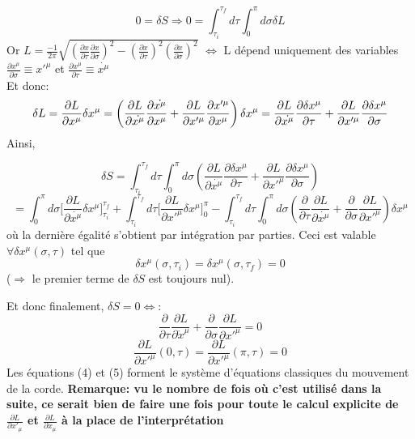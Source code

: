 \documentclass[a4paper,12pt]{article}
\begin{document}
\begin{equation}
0=\delta S
\Rightarrow
0=\int_{\tau_{i}}^{\tau_{f}}d\tau\int_{0}^{\pi}d\sigma\delta L
\end{equation}
Or $L=\frac{-1}{2\pi}\sqrt{\left( \frac{\partial x}{\partial \tau}\frac{\partial x}{\partial \sigma}\right)^{2}-\left( \frac{\partial x}{\partial \tau}\right) ^{2}\left( \frac{\partial x}{\partial \sigma}\right) ^{2}}$ $\Leftrightarrow$ L dépend uniquement des variables $ \frac{\partial x^{\mu}}{\partial \sigma}\equiv x'^{\mu}$ et $\frac{\partial x^{\mu}}{\partial \tau}\equiv \dot{x^{\mu}}$\\
Et donc:
\begin{equation}
\delta L= \frac{\partial L}{\partial x^{\mu}}\delta x^{\mu}=\left( \frac{\partial L}{\partial \dot{x^{\mu}}}\frac{\partial \dot{x^{\mu}}}{\partial x^{\mu}}+\frac{\partial L}{\partial x'^{\mu}}\frac{\partial x'^{\mu}}{\partial x^{\mu}}\right) \delta x^{\mu}\\
=\frac{\partial L}{\partial \dot{x^{\mu}}}\frac{\partial\delta x^{\mu}}{\partial \tau}+\frac{\partial L}{\partial x'^{\mu}}\frac{\partial\delta x^{\mu}}{\partial \sigma}
\end{equation}
Ainsi,

$$\delta S=\int_{\tau_{i}}^{\tau_{f}}d\tau\int_{0}^{\pi}d\sigma\left( \frac{\partial L}{\partial \dot{x^{\mu}}}\frac{\partial\delta x^{\mu}}{\partial \tau}+\frac{\partial L}{\partial x'^{\mu}}\frac{\partial\delta x^{\mu}}{\partial \sigma}\right) $$
$$=\int_{0}^{\pi}d\sigma \Big[\frac{\partial L}{\partial \dot{x^{\mu}}}\delta x^{\mu}\Big]^{\tau_{f}}_{\tau_{i}}+\int_{\tau_{i}}^{\tau_{f}}d\tau \Big[\frac{\partial L}{\partial x'^{\mu}}\delta x^{\mu}\Big]^{\pi}_{0}-\int_{\tau_{i}}^{\tau_{f}}d\tau\int_{0}^{\pi}d\sigma\left( \frac{\partial}{\partial \tau}\frac{\partial L}{\partial \dot{x^{\mu}}}+\frac{\partial}{\partial \sigma}\frac{\partial L}{\partial x'^{\mu}}\right)\delta x^{\mu}$$
où la dernière égalité s'obtient par intégration par parties.
Ceci est valable $\forall \delta x^{\mu}(\sigma,\tau)$ tel que 
$$\delta x^{\mu}(\sigma,\tau_{i})=\delta x^{\mu}(\sigma,\tau_{f})=0$$
($\Rightarrow$ le premier terme de $\delta S$ est toujours nul).

Et donc finalement, $\delta S=0 \Leftrightarrow$:
\begin{equation}
    \frac{\partial}{\partial \tau}\frac{\partial L}{\partial \dot x^{\mu}}+\frac{\partial}{\partial \sigma}\frac{\partial L}{\partial  x'^{\mu}}=0
\end{equation}
\begin{equation}
    \frac{\partial L}{\partial x'^{\mu}}(0, \tau)=\frac{\partial L}{\partial x'^{\mu}}(\pi, \tau)=0   
\end{equation}
Les équations (4) et (5) forment le système d'équations classiques du mouvement de la corde. 
\textbf{Remarque: vu le nombre de fois où c'est utilisé dans la suite, ce serait bien de faire une fois pour toute le calcul explicite de $\frac{\partial L}{\partial x'_{\mu}}$ et $\frac{\partial L}{\partial \dot x_{\mu}}$ à la place de l'interprétation} 
\end{document}
